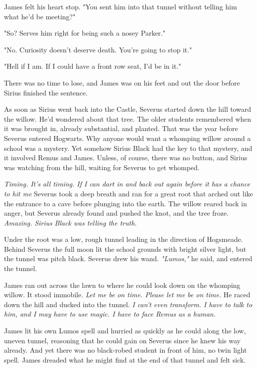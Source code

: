 James felt his heart stop. "You sent him into that tunnel without telling him what he'd be meeting?"

"So? Serves him right for being such a nosey Parker."

"No. Curiosity doesn't deserve death. You're going to stop it."

"Hell if I am. If I could have a front row seat, I'd be in it."

There was no time to lose, and James was on his feet and out the door before Sirius finished the sentence.

As soon as Sirius went back into the Castle, Severus started down the hill toward the willow. He'd wondered about that tree. The older students remembered when it was brought in, already substantial, and planted. That was the year before Severus entered Hogwarts. Why anyone would want a whomping willow around a school was a mystery. Yet somehow Sirius Black had the key to that mystery, and it involved Remus and James. Unless, of course, there was no button, and Sirius was watching from the hill, waiting for Severus to get whomped.

\emph{Timing. It's all timing. If I can dart in and back out again before it has a chance to hit me{\el}} Severus took a deep breath and ran for a great root that arched out like the entrance to a cave before plunging into the earth. The willow reared back in anger, but Severus already found and pushed the knot, and the tree froze. \emph{Amazing. Sirius Black was telling the truth.}

Under the root was a low, rough tunnel leading in the direction of Hogsmeade. Behind Severus the full moon lit the school grounds with bright silver light, but the tunnel was pitch black. Severus drew his wand. \emph{"Lumos,"} he said, and entered the tunnel.

James ran out across the lawn to where he could look down on the whomping willow. It stood immobile. \emph{Let me be on time. Please let me be on time.} He raced down the hill and ducked into the tunnel. \emph{I can't even transform. I have to talk to him, and I may have to use magic. I have to face Remus as a human.}

James lit his own Lumos spell and hurried as quickly as he could along the low, uneven tunnel, reasoning that he could gain on Severus since he knew his way already. And yet there was no black-robed student in front of him, no twin light spell. James dreaded what he might find at the end of that tunnel and felt sick.

